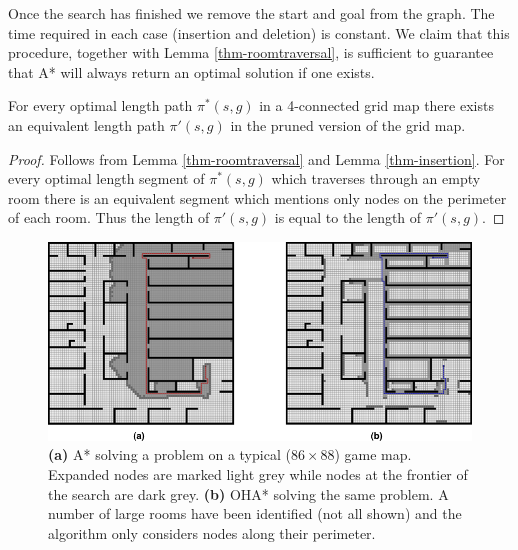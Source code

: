 Once the search has finished we remove the start and goal from the graph.
The time required in each case (insertion and deletion) is constant.
We claim that this procedure, together with Lemma \ref{thm-roomtraversal}, is sufficient to 
guarantee that A* will always return an optimal solution if one exists.

\begin{theorem}
For every optimal length path $\pi^*(s, g)$ in a 4-connected grid map there exists
an equivalent length path $\pi'(s, g)$ in the pruned version of the grid map.
\end{theorem}
\begin{proof}
Follows from Lemma \ref{thm-roomtraversal} and Lemma \ref{thm-insertion}.
For every optimal length segment of $\pi^{*}(s, g)$ which traverses
through an empty room there is an equivalent segment which mentions only nodes
on the perimeter of each room. 
Thus the length of $\pi'(s, g)$ is equal to the length of $\pi'(s,g)$.
\end{proof}

\begin{figure}[t]
	\label{fig-contrast}
	\vspace{-4pt}
       \begin{center}
           \includegraphics[scale=0.50, trim = 10mm 10mm 10mm 0mm]{diagrams/oha_contrast.png}
       \end{center}
	\vspace{-3pt}
       \caption{\textbf{(a)} A* solving a problem on a typical ($86\times88$) game map. 
Expanded nodes are marked light grey while nodes at the frontier of the search are dark grey.
\textbf{(b)} OHA* solving the same problem. A number of large rooms have been identified (not
all shown) and the algorithm only considers nodes along their perimeter.}
	\vspace{-15pt}
\end{figure}

